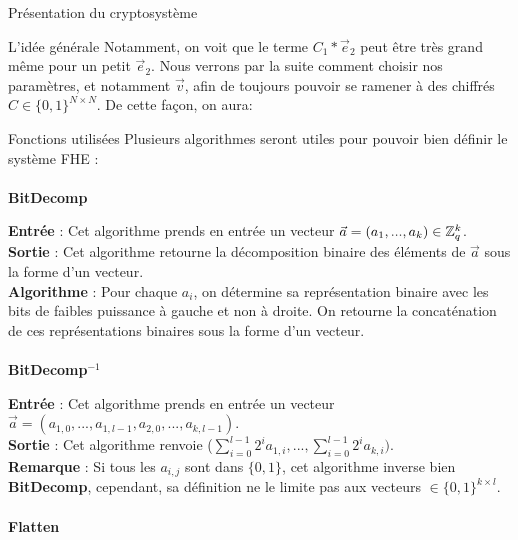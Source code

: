 \begin{section}{Présentation du cryptosystème}
\begin{subsection}{L'idée générale}
	Notamment, on voit que le terme $C_1 * \vec{e}_2$ peut être très grand 
	même pour un petit $\vec{e}_2$. Nous verrons par la suite comment
	choisir nos paramètres, et notamment $\vec{v}$, afin de 
	toujours pouvoir se ramener à des chiffrés $C \in \{0,1\}^{N
	\times N}$. De cette façon, on aura:

	
	
	




	\end{subsection}
	\begin{subsection}{Fonctions utilisées}
	Plusieurs algorithmes seront utiles pour pouvoir bien définir le système FHE :
	
	\paragraph{}
	\textbf{BitDecomp}
	\flushleft

	\textbf{Entrée} : Cet algorithme prends en entrée un vecteur $\vec{a} = (a_1, ..., a_k) \in \mathbb{Z}_q^{k}$. \\
	\textbf{Sortie} : Cet algorithme retourne la décomposition binaire des éléments de $\vec{a}$ sous la forme d'un vecteur. \\
	\textbf{Algorithme} : Pour chaque $a_i$, on détermine sa représentation binaire avec les bits de faibles puissance à gauche et non à droite. On retourne la concaténation de ces représentations binaires sous la forme d'un vecteur.
	
	\paragraph{}
	\textbf{BitDecomp}$^{-1}$
	\flushleft

	\textbf{Entrée} : Cet algorithme prends en entrée un vecteur $\vec{a} = (a_{1,0}, ..., a_{1,l-1}, a_{2,0}, ..., a_{k,l-1})$. \\
	\textbf{Sortie} : Cet algorithme renvoie ($\sum\limits_{i=0}^{l-1} 2^{i} a_{1,i}, ..., \sum\limits_{i=0}^{l-1} 2^{i} a_{k,i})$. \\
	\textbf{Remarque} : Si tous les $a_{i,j}$ sont dans $\{ 0,1 \} $, cet algorithme inverse bien \textbf{BitDecomp}, cependant, sa définition ne le limite pas aux vecteurs $\in \{ 0,1\} ^{k\times l}$.

	\paragraph{}
	\textbf{Flatten}
	\flushleft


\end{subsection}
\end{section}
